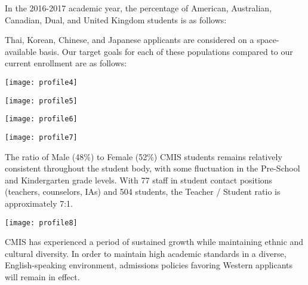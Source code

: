 In the 2016-2017 academic year, the percentage of American, Australian, Canadian, Dual, and United Kingdom students is as follows:


Thai, Korean, Chinese, and Japanese applicants are considered on a space-available basis.  Our target goals for each of these populations compared to our current enrollment are as follows:


\texttt{[image: profile4]}

\texttt{[image: profile5]}

\texttt{[image: profile6]}

\texttt{[image: profile7]}


The ratio of Male (48\%) to Female (52\%) CMIS students remains relatively consistent throughout the student body, with some fluctuation in the Pre-School and Kindergarten grade levels.   With 77 staff in student contact positions (teachers, counselors, IAs) and 504 students, the Teacher / Student ratio is approximately 7:1.  

\texttt{[image: profile8]}


CMIS has experienced a period of sustained growth while maintaining ethnic and cultural diversity.  In order to maintain high academic standards in a diverse, English-speaking environment, admissions policies favoring Western applicants will remain in effect.  

